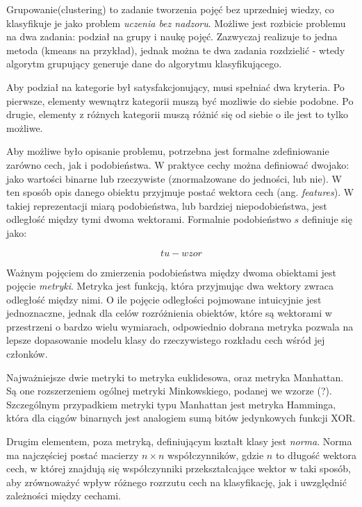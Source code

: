 \documentclass[12pt,a4paper,oneside]{report} %
\begin{document}
Grupowanie(clustering) to zadanie tworzenia pojęć bez uprzedniej wiedzy, co klasyfikuje je jako problem \emph{uczenia bez nadzoru}. Możliwe jest rozbicie problemu na dwa zadania: podział na grupy i naukę pojęć. Zazwyczaj realizuje to jedna metoda (kmeans na przykład), jednak można te dwa zadania rozdzielić - wtedy algorytm grupujący generuje dane do algorytmu klasyfikującego.

Aby podział na kategorie był satysfakcjonujący, musi spełniać dwa kryteria. Po pierwsze, elementy wewnątrz kategorii muszą być mozliwie do siebie podobne. Po drugie, elementy z różnych kategorii muszą różnić się od siebie o ile jest to tylko możliwe.\par

Aby możliwe było opisanie problemu, potrzebna jest formalne zdefiniowanie zarówno cech, jak i podobieństwa. W praktyce cechy można definiować dwojako: jako wartości binarne lub rzeczywiste (znormalzowane do jedności, lub nie). W ten sposób opis danego obiektu przyjmuje postać wektora cech (ang. \emph{features}). W takiej reprezentacji miarą podobieństwa, lub bardziej niepodobieństwa, jest odległość między tymi dwoma wektorami. Formalnie podobieństwo $s$ definiuje się jako:\par

\begin{equation}
tu-wzor
\end{equation}

Ważnym pojęciem do zmierzenia podobieństwa między dwoma obiektami jest pojęcie \emph{metryki}. Metryka jest funkcją, która przyjmując dwa wektory zwraca odległość między nimi. O ile pojęcie odległości pojmowane intuicyjnie jest jednoznaczne, jednak dla celów rozróżnienia obiektów, które są wektorami w przestrzeni o bardzo wielu wymiarach, odpowiednio dobrana metryka pozwala na lepsze dopasowanie modelu klasy do rzeczywistego rozkładu cech wśród jej członków.\par

Najważniejsze dwie metryki to metryka euklidesowa, oraz metryka Manhattan. Są one rozszerzeniem ogólnej metryki Minkowskiego, podanej we wzorze (?). Szczególnym przypadkiem metryki typu Manhattan jest metryka Hamminga, która dla ciągów binarnych jest analogiem sumą bitów jedynkowych funkcji XOR. \par

Drugim elementem, poza metryką, definiującym kształt klasy jest \emph{norma}. Norma ma najczęściej postać macierzy $n \times n$ współczynników, gdzie $n$ to długość wektora cech, w której znajdują się współczynniki przekształcające wektor w taki sposób, aby zrównoważyć wpływ różnego rozrzutu cech na klasyfikację, jak i uwzględnić zależności między cechami. \par
\end{document}
